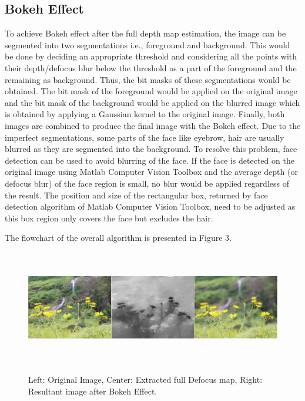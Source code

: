 \documentclass[letterpaper, 10 pt, conference]{ieeeconf}  %
\begin{document}
\subsection{Bokeh Effect}

To achieve Bokeh effect after the full depth map estimation, the image can be segmented into two segmentations i.e., foreground and background. This would be done by deciding an appropriate threshold and considering all the points with their depth/defocus blur below the threshold as a part of the foreground and the remaining as background. Thus, the bit masks of these segmentations would be obtained. The bit mask of the foreground would be applied on the original image and the bit mask of the background would be applied on the blurred image which is obtained by applying a Gaussian kernel to the original image. Finally, both images are combined to produce the final image with the Bokeh effect. Due to the imperfect segmentations, some parts of the face like eyebrow, hair are usually blurred as they are segmented into the background. To resolve this problem, face detection can be used to avoid blurring of the face. If the face is detected on the original image using Matlab Computer Vision Toolbox and the average depth (or defocus blur) of the face region is small, no blur would be applied regardless of the result. The position and size of the rectangular box, returned by face detection algorithm of Matlab Computer Vision Toolbox, need to be adjusted as this box region only covers the face but excludes the hair.

The flowchart of the overall algorithm is presented in Figure 3.

\begin{figure}[h]
\centering
\includegraphics[width=16cm, height=5cm]{out1.png}
\label{fig:subim14}
\caption{Left: Original Image, Center: Extracted full Defocus map, Right: Resultant image after Bokeh Effect.}
\end{figure}
\end{document}
